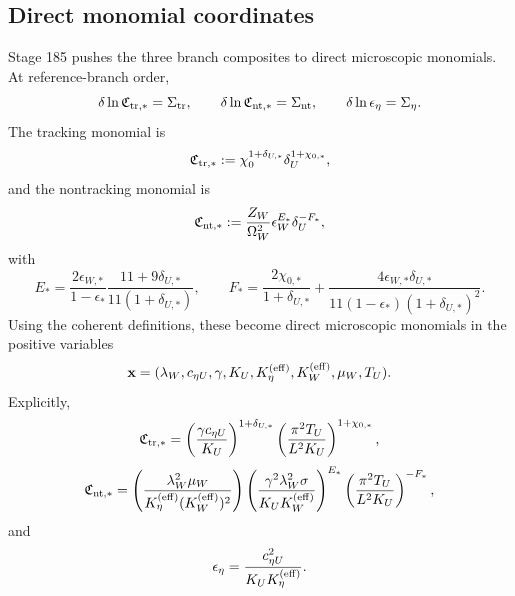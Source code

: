 \subsection{Direct monomial coordinates}
Stage 185 pushes the three branch composites to direct microscopic monomials.  At reference-branch order,
\begin{equation}
\label{eq:app-part05-monomial-drift-laws}
\delta\ln\mathfrak C_{{\rm tr},*}=\Sigma_{\rm tr},
\qquad
\delta\ln\mathfrak C_{{\rm nt},*}=\Sigma_{\rm nt},
\qquad
\delta\ln\epsilon_\eta=\Sigma_\eta.
\end{equation}
The tracking monomial is
\begin{equation}
\label{eq:app-part05-Ctr-monomial-simple}
\mathfrak C_{{\rm tr},*}
:=
\chi_0^{1+\delta_{U,*}}\delta_U^{1+\chi_{0,*}},
\end{equation}
and the nontracking monomial is
\begin{equation}
\label{eq:app-part05-Cnt-monomial-simple}
\mathfrak C_{{\rm nt},*}
:=
\frac{Z_W}{\Omega_W^2}\epsilon_W^{E_*}\delta_U^{-F_*},
\end{equation}
with
\begin{equation}
\label{eq:app-part05-EF-defs}
E_*=
\frac{2\epsilon_{W,*}}{1-\epsilon_*}\frac{11+9\delta_{U,*}}{11(1+\delta_{U,*})},
\qquad
F_*=
\frac{2\chi_{0,*}}{1+\delta_{U,*}}
+
\frac{4\epsilon_{W,*}\delta_{U,*}}{11(1-\epsilon_*)(1+\delta_{U,*})^2}.
\end{equation}
Using the coherent definitions, these become direct microscopic monomials in the positive variables
\begin{equation}
\label{eq:app-part05-micro-state-vector}
\mathbf x
=
(\lambda_W,
 c_{\eta U},
 \gamma,
 K_U,
 K_\eta^{({\rm eff})},
 K_W^{({\rm eff})},
 \mu_W,
 T_U).
\end{equation}
Explicitly,
\begin{equation}
\label{eq:app-part05-Ctr-micro}
\mathfrak C_{{\rm tr},*}
=
\left(\frac{\gamma c_{\eta U}}{K_U}\right)^{1+\delta_{U,*}}
\left(\frac{\pi^2T_U}{L^2K_U}\right)^{1+\chi_{0,*}},
\end{equation}
\begin{equation}
\label{eq:app-part05-Cnt-micro}
\mathfrak C_{{\rm nt},*}
=
\left(\frac{\lambda_W^2\mu_W}{K_\eta^{({\rm eff})}(K_W^{({\rm eff})})^2}\right)
\left(\frac{\gamma^2\lambda_W^2\sigma}{K_UK_W^{({\rm eff})}}\right)^{E_*}
\left(\frac{\pi^2T_U}{L^2K_U}\right)^{-F_*},
\end{equation}
and
\begin{equation}
\label{eq:app-part05-epsilon-eta-monomial}
\epsilon_\eta=\frac{c_{\eta U}^2}{K_UK_\eta^{({\rm eff})}}.
\end{equation}


